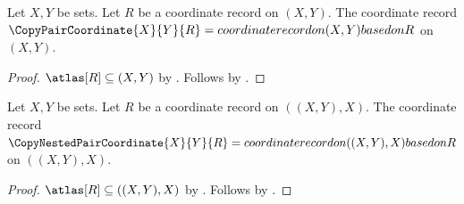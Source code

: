 

\begin{construction}\label{copy_pair_coordinate}
    Let $X,Y$ be sets.
    Let $R$ be a coordinate record on $(X,Y)$.
    The coordinate record $\CopyPairCoordinate{X}{Y}{R}=
        coordinate record on (X,Y) based on R$ on $(X,Y)$.
\end{construction}
\begin{proof}
    $\atlas[R]\subseteq (X,Y)$ by .
    Follows by .
\end{proof}

\begin{construction}\label{copy_nested_pair_coordinate}
    Let $X,Y$ be sets.
    Let $R$ be a coordinate record on $((X,Y),X)$.
    The coordinate record $\CopyNestedPairCoordinate{X}{Y}{R}=
        coordinate record on ((X,Y),X) based on R$ on $((X,Y),X)$.
\end{construction}
\begin{proof}
    $\atlas[R]\subseteq ((X,Y),X)$ by .
    Follows by .
\end{proof}
